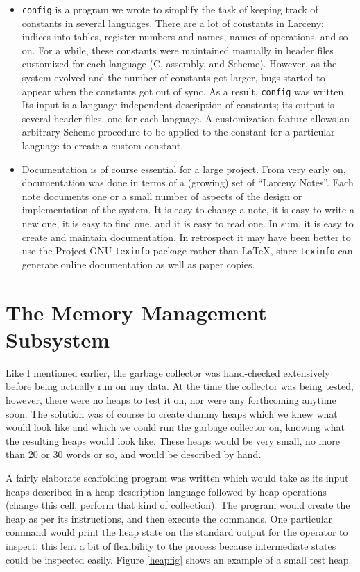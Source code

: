 \begin{itemize}
\item
{\tt config} is a program we wrote to simplify the task of keeping track of
constants in several languages. There are a lot of constants in Larceny:
indices into tables, register numbers and names, names of operations, and so
on. For a while, these constants were maintained manually in header files
customized for each language (C, assembly, and Scheme). However, as the
system evolved and the number of constants got larger, bugs started
to appear when the constants got out of sync. As a result, {\tt config} was
written. Its input is a language-independent description of constants; its
output is several header files, one for each language. A customization
feature allows an arbitrary Scheme procedure to be applied to the constant
for a particular language to create a custom constant.

\item
Documentation is of course essential for a large project. From very early
on, documentation was done in terms of a (growing) set of ``Larceny Notes''.
Each note documents one or a small number of aspects of the design or
implementation of the system. It is easy to change a note, it is easy to
write a new one, it is easy to find one, and it is easy to read one. In sum,
it is easy to create and maintain documentation. In retrospect it may have
been better to use the Project GNU {\tt texinfo} package rather than \LaTeX,
since {\tt texinfo} can generate online documentation as well as paper
copies.

\end{itemize}

\section{The Memory Management Subsystem}

Like I mentioned earlier, the garbage collector was hand-checked extensively
before being actually run on any data. At the time the collector was being
tested, however, there were no heaps to test it on, nor were any forthcoming
anytime soon. The solution was of course to create dummy heaps which we knew
what would look like and which we could run the garbage collector on,
knowing what the resulting heaps would look like. These heaps would be very
small, no more than 20 or 30 words or so, and would be described by hand.

A fairly elaborate scaffolding program was written which would take as its
input heaps described in a heap description language followed by heap
operations (change this cell, perform that kind of collection).  The program
would create the heap as per its instructions, and then execute the
commands. One particular command would print the heap state on the standard
output for the operator to inspect; this lent a bit of flexibility to the
process because
intermediate states could be inspected easily. Figure \ref{heapfig} shows
an example of a small test heap.

